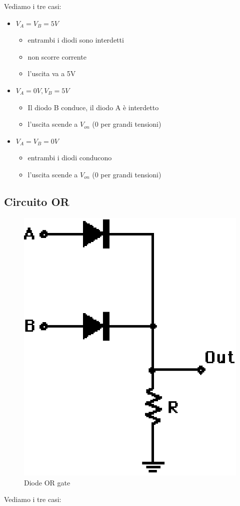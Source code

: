 Vediamo i tre casi:

\begin{itemize}
    \item $V_A = V_B = 5V$
    \begin{itemize}
        \item entrambi i diodi sono interdetti
        \item non scorre corrente 
        \item l'uscita va a 5V
    \end{itemize}
    \item $V_A = 0V,  V_B = 5V$
    \begin{itemize}
        \item Il diodo B conduce, il diodo A è interdetto
        \item l'uscita scende a $V_{on}$ (0 per grandi tensioni)
    \end{itemize}
    \item $V_A = V_B = 0V$
    \begin{itemize}
        \item entrambi i diodi conducono
        \item l'uscita scende a $V_{on}$ (0 per grandi tensioni)
    \end{itemize}
\end{itemize}

\subsection{Circuito OR}
\begin{figure}[htbp]
    \centering
    \includegraphics[width=0.17\linewidth]{img/OR_GATE.png}
    \caption{Diode OR gate}
    
\end{figure}

Vediamo i tre casi:

